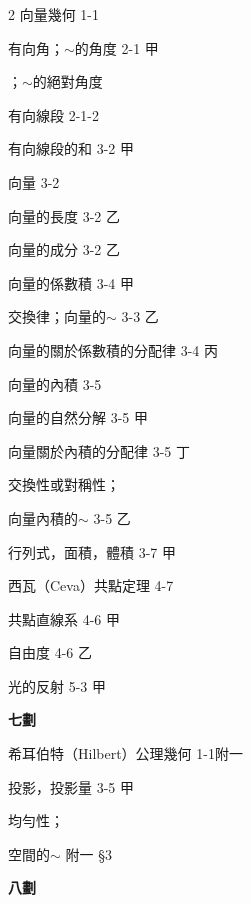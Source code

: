 \begin{multicols}{2}
\noindent 向量幾何 \hfill 1-1\par
\noindent 有向角；$\sim$的角度 \hfill 2-1 甲\par
\noindent\hspace*{1.5em} ；$\sim$的絕對角度\par
\noindent 有向線段 \hfill 2-1-2\par
\noindent 有向線段的和 \hfill 3-2 甲\par
\noindent 向量 \hfill 3-2\par
\noindent 向量的長度 \hfill 3-2 乙\par
\noindent 向量的成分 \hfill 3-2 乙\par
\noindent 向量的係數積 \hfill 3-4 甲\par
\noindent 交換律；向量的$\sim$ \hfill 3-3 乙\par
\noindent 向量的關於係數積的分配律 \hfill 3-4 丙\par
\noindent 向量的內積 \hfill 3-5\par
\noindent 向量的自然分解 \hfill 3-5 甲\par
\noindent 向量關於內積的分配律 \hfill 3-5 丁\par
\noindent 交換性或對稱性；\par
\noindent\hspace*{1.5em} 向量內積的$\sim$ \hfill 3-5 乙\par
\noindent 行列式，面積，體積 \hfill 3-7 甲\par
\noindent 西瓦（Ceva）共點定理 \hfill 4-7\par
\noindent 共點直線系 \hfill 4-6 甲\par
\noindent 自由度 \hfill 4-6 乙\par
\noindent 光的反射 \hfill 5-3 甲\par

\vspace{0.8em}
\begin{center}
\textbf{\large 七\quad 劃}
\end{center}

\noindent 希耳伯特（Hilbert）公理幾何 \hfill 1-1\quad 附一\par
\noindent 投影，投影量 \hfill 3-5 甲\par
\noindent 均勻性；\par
\noindent\hspace*{1.5em} 空間的$\sim$ \hfill 附一 \S 3\par

\vspace{0.8em}
\begin{center}
\textbf{\large 八\quad 劃}
\end{center}


\end{multicols}
